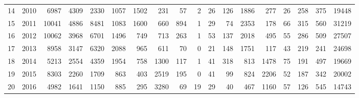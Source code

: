 \documentclass[]{article}
\begin{document}
\begin{table}[ht]
\begin{tabular}{rrrrrrrrrrrrrrrrrr}
  14 & 2010 & 6987 & 4309 & 2330 & 1057 & 1502 & 231 &  57 &   2 &  26 & 126 & 1886 & 277 &  26 & 258 & 375 & 19448 \\ 
  15 & 2011 & 10041 & 4886 & 8481 & 1083 & 1600 & 660 & 894 &   1 &  29 &  74 & 2353 & 178 &  66 & 315 & 560 & 31219 \\ 
  16 & 2012 & 10062 & 3968 & 6701 & 1496 & 749 & 713 & 263 &   1 &  53 & 137 & 2018 & 495 &  55 & 286 & 509 & 27507 \\ 
  17 & 2013 & 8958 & 3147 & 6320 & 2088 & 965 & 611 &  70 &   0 &  21 & 148 & 1751 & 117 &  43 & 219 & 241 & 24698 \\ 
  18 & 2014 & 5213 & 2554 & 4359 & 1954 & 758 & 1300 & 117 &   1 &  41 & 318 & 813 & 1478 &  75 & 191 & 497 & 19669 \\ 
  19 & 2015 & 8303 & 2260 & 1709 & 863 & 403 & 2519 & 195 &   0 &  41 &  99 & 824 & 2206 &  52 & 187 & 342 & 20002 \\ 
  20 & 2016 & 4982 & 1641 & 1150 & 885 & 295 & 3280 &  69 &  19 &  29 &  40 & 467 & 1160 &  57 & 126 & 545 & 14743 \\ 
   \hline
\end{tabular}
\end{table}
\end{document}

